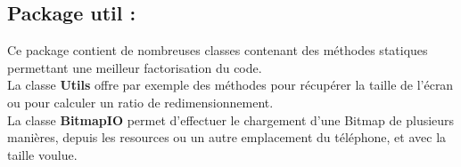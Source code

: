 \subsection{Package \textbf{util} :}
Ce package contient de nombreuses classes contenant des méthodes statiques permettant une meilleur factorisation du code.
\\
La classe \textbf{Utils} offre par exemple des méthodes pour récupérer la taille de l'écran ou pour calculer un ratio de redimensionnement.
\\
La classe \textbf{BitmapIO} permet d'effectuer le chargement d'une Bitmap de plusieurs manières, depuis les resources ou un autre emplacement du téléphone, et avec la taille voulue.
